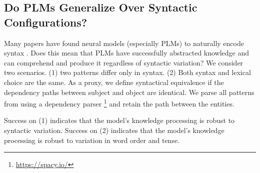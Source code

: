 % 

% 





% 




\subsection{Do PLMs Generalize Over Syntactic Configurations?} 



Many papers have found neural models (especially PLMs) to naturally
encode syntax
\cite{linzen2016assessing,marvin-linzen-2018-targeted,yoav-syntax,hewitt2019structural}.
Does this mean that PLMs have successfully abstracted
knowledge and can comprehend and produce it regardless of
syntactic variation?
We consider two scenarios. (1) two patterns differ only in
syntax. (2) Both  syntax and  lexical choice are the same.
As a proxy, we define syntactical equivalence if the dependency
paths between subject and object are identical.
We parse all patterns from \resource{} using a dependency parser \cite{spacy}\footnote{\url{https://spacy.io/}} and retain the path between the entities.

Success on (1) indicates
that the model's knowledge processing is robust to syntactic
variation.
Success on (2) indicates
that the model's knowledge processing is robust to
variation in word order and tense.



